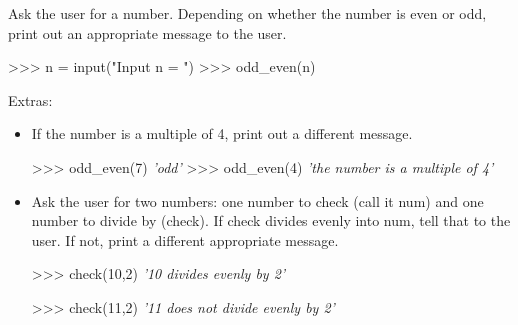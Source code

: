 \documentclass[11pt]{article}
\newenvironment{Shaded}{}{}
\newcommand{\DecValTok}[1]{\textcolor[rgb]{0.25,0.63,0.44}{{#1}}}
\newcommand{\StringTok}[1]{\textcolor[rgb]{0.25,0.44,0.63}{{#1}}}
\newcommand{\CommentTok}[1]{\textcolor[rgb]{0.38,0.63,0.69}{\textit{{#1}}}}
\newcommand{\NormalTok}[1]{{#1}}
\newcommand{\OperatorTok}[1]{\textcolor[rgb]{0.40,0.40,0.40}{{#1}}}
\newcommand{\BuiltInTok}[1]{{#1}}
\begin{document}
Ask the user for a number. Depending on whether the number is even or
odd, print out an appropriate message to the user.

\begin{Shaded}
\begin{Highlighting}[]
\OperatorTok{>>>}\NormalTok{ n }\OperatorTok{=} \BuiltInTok{input}\NormalTok{(}\StringTok{"Input n = "}\NormalTok{)}
\OperatorTok{>>>}\NormalTok{ odd_even(n) }
\end{Highlighting}
\end{Shaded}

Extras:

\begin{itemize}
\item
  If the number is a multiple of 4, print out a different message.

\begin{Shaded}
\begin{Highlighting}[]
\OperatorTok{>>>}\NormalTok{ odd_even(}\DecValTok{7}\NormalTok{)}
  \CommentTok{'odd'}
\OperatorTok{>>>}\NormalTok{ odd_even(}\DecValTok{4}\NormalTok{)}
  \CommentTok{'the number is a multiple of 4'} 
\end{Highlighting}
\end{Shaded}
\item
  Ask the user for two numbers: one number to check (call it num) and
  one number to divide by (check). If check divides evenly into num,
  tell that to the user. If not, print a different appropriate message.

\begin{Shaded}
\begin{Highlighting}[]
\OperatorTok{>>>}\NormalTok{ check(}\DecValTok{10}\NormalTok{,}\DecValTok{2}\NormalTok{)}
    \CommentTok{'10 divides evenly by 2'}

\OperatorTok{>>>}\NormalTok{ check(}\DecValTok{11}\NormalTok{,}\DecValTok{2}\NormalTok{)}
    \CommentTok{'11 does not divide evenly by 2'}
\end{Highlighting}
\end{Shaded}
\end{itemize}
\end{document}
